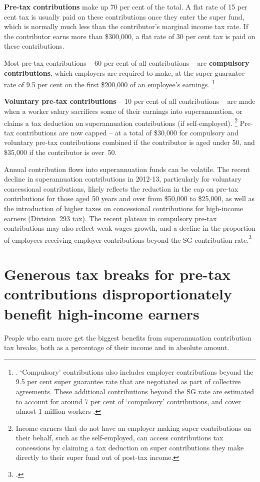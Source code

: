 \textbf{Pre-tax contributions} make up 70 per cent of the total. A flat rate of 15 per cent tax is usually paid on these contributions once they enter the super fund, which is normally much less than the contributor’s marginal income tax rate. If the contributor earns more than \$300,000, a flat rate of 30 per cent tax is paid on these contributions.

Most pre-tax contributions – 60 per cent of all contributions – are \textbf{compulsory contributions}, which employers are required to make, at the super guarantee rate of 9.5 per cent on the first \$200,000 of an employee’s earnings.%
\footnote{\textcites{APRA2014}{ATO2015SampleFile1213}{ATO2015MaxSuperContrBase}. `Compulsory' contributions also includes employer contributions beyond the 9.5 per cent super guarantee rate that are negotiated as part of collective agreements. These additional contributions beyond the SG rate are estimated to account for around 7 per cent of ‘compulsory’ contributions, and cover almost 1 million workers \textcite[][16]{Kelly2013}.}  

\textbf{Voluntary pre-tax contributions} – 10 per cent of all contributions – are made when a worker salary sacrifices some of their earnings into superannuation, or claims a tax deduction on superannuation contributions (if self-employed).%
\footnote{Income earners that do not have an employer making super contributions on their behalf, such as the self-employed, can access contributions tax concessions by claiming a tax deduction on super contributions they make directly to their super fund out of post-tax income.}
Pre-tax contributions are now capped – at a total of \$30,000 for compulsory and voluntary pre-tax contributions combined if the contributor is aged under 50, and \$35,000 if the contributor is over~50.

Annual contribution flows into superannuation funds can be volatile. The recent decline in superannuation contributions in 2012-13, particularly for voluntary concessional contributions, likely reflects the reduction in the cap on pre-tax contributions for those aged 50 years and over from \$50,000 to \$25,000, as well as the introduction of higher taxes on concessional contributions for high-income earners (Division~293 tax). The recent plateau in compulsory pre-tax contributions may also reflect weak wages growth, and a decline in the proportion of employees receiving employer contributions beyond the SG contribution rate.\footcite[][15--16]{Kelly2013}

\section{Generous tax breaks for pre-tax contributions disproportionately benefit high-income earners}
People who earn more get the biggest benefits from superannuation contribution tax breaks, both as a percentage of their income and in absolute amount. 

